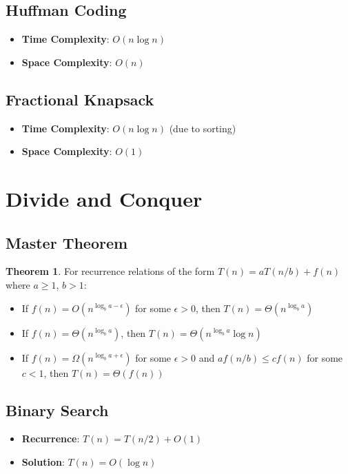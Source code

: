 \documentclass[11pt]{article}
\theoremstyle{definition}
\newtheorem{theorem}{Theorem}[section]
\begin{document}
\subsection{Huffman Coding}
\begin{itemize}
    \item \textbf{Time Complexity}: $O(n \log n)$
    \item \textbf{Space Complexity}: $O(n)$
\end{itemize}

\subsection{Fractional Knapsack}
\begin{itemize}
    \item \textbf{Time Complexity}: $O(n \log n)$ (due to sorting)
    \item \textbf{Space Complexity}: $O(1)$
\end{itemize}

\section{Divide and Conquer}

\subsection{Master Theorem}
\begin{theorem}
For recurrence relations of the form $T(n) = aT(n/b) + f(n)$ where $a \geq 1$, $b > 1$:
\begin{itemize}
    \item If $f(n) = O(n^{\log_b a - \epsilon})$ for some $\epsilon > 0$, then $T(n) = \Theta(n^{\log_b a})$
    \item If $f(n) = \Theta(n^{\log_b a})$, then $T(n) = \Theta(n^{\log_b a} \log n)$
    \item If $f(n) = \Omega(n^{\log_b a + \epsilon})$ for some $\epsilon > 0$ and $af(n/b) \leq cf(n)$ for some $c < 1$, then $T(n) = \Theta(f(n))$
\end{itemize}
\end{theorem}

\subsection{Binary Search}
\begin{itemize}
    \item \textbf{Recurrence}: $T(n) = T(n/2) + O(1)$
    \item \textbf{Solution}: $T(n) = O(\log n)$
\end{itemize}
\end{document}
